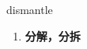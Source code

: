 
\begin{frame}
{\huge dismantle}
\begin{center}
\begin{enumerate}\Large
  \item \textbf{分解，分拆}
\end{enumerate}
\end{center}
\end{frame}
